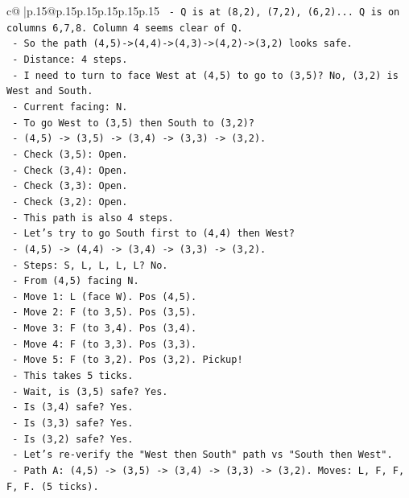 \documentclass{article}
\begin{document}
{\begin{supertabular}{c@{$\;$}|p{.15\linewidth}@{}p{.15\linewidth}p{.15\linewidth}p{.15\linewidth}p{.15\linewidth}p{.15\linewidth}}
{{{\texttt{    {-} Q is at (8,2), (7,2), (6,2)... Q is on columns 6,7,8. Column 4 seems clear of Q.} \\
\texttt{  {-} So the path (4,5){-}>(4,4){-}>(4,3){-}>(4,2){-}>(3,2) looks safe.} \\
\texttt{  {-} Distance: 4 steps.} \\
\texttt{  {-} I need to turn to face West at (4,5) to go to (3,5)? No, (3,2) is West and South.} \\
\texttt{  {-} Current facing: N.} \\
\texttt{  {-} To go West to (3,5) then South to (3,2)?} \\
\texttt{    {-} (4,5) {-}> (3,5) {-}> (3,4) {-}> (3,3) {-}> (3,2).} \\
\texttt{    {-} Check (3,5): Open.} \\
\texttt{    {-} Check (3,4): Open.} \\
\texttt{    {-} Check (3,3): Open.} \\
\texttt{    {-} Check (3,2): Open.} \\
\texttt{    {-} This path is also 4 steps.} \\
\texttt{  {-} Let's try to go South first to (4,4) then West?} \\
\texttt{    {-} (4,5) {-}> (4,4) {-}> (3,4) {-}> (3,3) {-}> (3,2).} \\
\texttt{    {-} Steps: S, L, L, L, L? No.} \\
\texttt{    {-} From (4,5) facing N.} \\
\texttt{    {-} Move 1: L (face W). Pos (4,5).} \\
\texttt{    {-} Move 2: F (to 3,5). Pos (3,5).} \\
\texttt{    {-} Move 3: F (to 3,4). Pos (3,4).} \\
\texttt{    {-} Move 4: F (to 3,3). Pos (3,3).} \\
\texttt{    {-} Move 5: F (to 3,2). Pos (3,2). Pickup!} \\
\texttt{    {-} This takes 5 ticks.} \\
\texttt{    {-} Wait, is (3,5) safe? Yes.} \\
\texttt{    {-} Is (3,4) safe? Yes.} \\
\texttt{    {-} Is (3,3) safe? Yes.} \\
\texttt{    {-} Is (3,2) safe? Yes.} \\
\texttt{    {-} Let's re{-}verify the "West then South" path vs "South then West".} \\
\texttt{    {-} Path A: (4,5) {-}> (3,5) {-}> (3,4) {-}> (3,3) {-}> (3,2). Moves: L, F, F, F, F. (5 ticks).} \\
}}}
\end{supertabular}}
\end{document}
